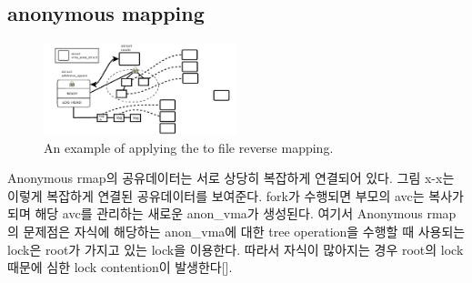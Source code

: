 


\subsection{anonymous mapping}

\begin{figure}[tb]
  \begin{center}
     \includegraphics[width=0.5\textwidth,height=0.5\textheight,keepaspectratio]{fig/anon_vma}
  \end{center}
  \caption{An example of applying the  to file reverse mapping. }
  \label{fig:deferu2}
\end{figure}


Anonymous rmap의 공유데이터는 서로 상당히 복잡하게 연결되어 있다. 
그림 x-x는 이렇게 복잡하게 연결된 공유데이터를 보여준다.
fork가 수행되면 부모의 avc는 복사가 되며 해당 avc를 관리하는 새로운 anon\_vma가 생성된다. 
여기서 Anonymous rmap의 문제점은 자식에 해당하는 anon\_vma에 대한 tree operation을 수행할 때 사용되는
lock은 root가 가지고 있는 lock을 이용한다. 
따라서 자식이 많아지는 경우 root의 lock 때문에 심한 lock contention이 발생한다[].


